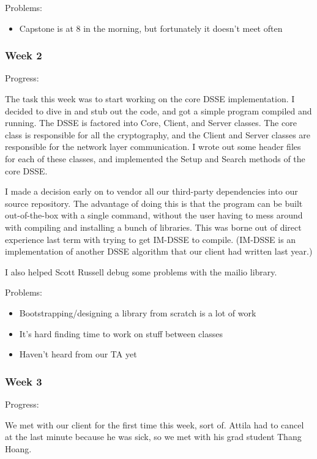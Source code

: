\documentclass[onecolumn, draftclsnofoot,10pt, compsoc]{IEEEtran}
\begin{document}
\noindent Problems: 
\begin{itemize}
\item Capstone is at 8 in the morning, but fortunately it doesn't meet often
\end{itemize}

\subsubsection{Week 2}

\noindent Progress:

The task this week was to start working on the core DSSE implementation. I decided to dive in and stub out the code, and got a simple program compiled and running. The DSSE is factored into Core, Client, and Server classes. The core class is responsible for all the cryptography, and the Client and Server classes are responsible for the network layer communication. I wrote out some header files for each of these classes, and implemented the Setup and Search methods of the core DSSE.

I made a decision early on to vendor all our third-party dependencies into our source repository. The advantage of doing this is that the program can be built out-of-the-box with a single command, without the user having to mess around with compiling and installing a bunch of libraries. This was borne out of direct experience last term with trying to get IM-DSSE to compile. (IM-DSSE is an implementation of another DSSE algorithm that our client had written last year.)

I also helped Scott Russell debug some problems with the mailio library.

\noindent Problems: 
\begin{itemize}
  \item Bootstrapping/designing a library from scratch is a lot of work 
  \item It's hard finding time to work on stuff between classes 
  \item Haven't heard from our TA yet
\end{itemize}

\subsubsection{Week 3}

\noindent Progress: 

We met with our client for the first time this week, sort of. Attila had to cancel at the last minute because he was sick, so we met with his grad student Thang Hoang.
\end{document}
